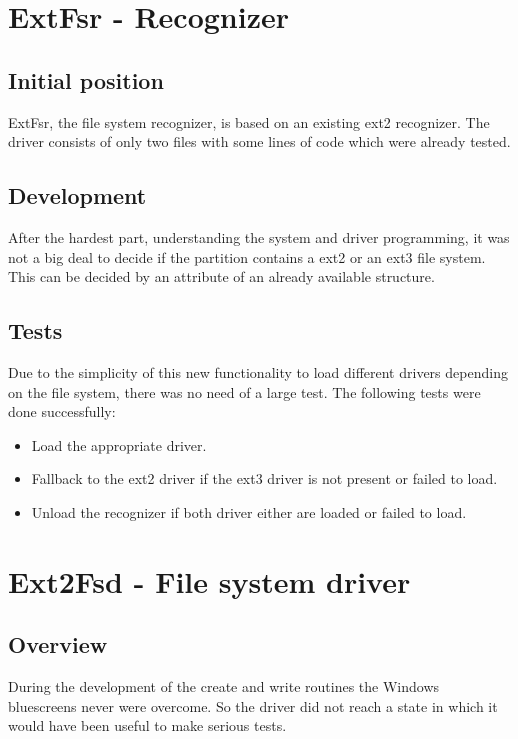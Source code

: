 \chapter{ExtFsr - Recognizer}
\label{cha:extfsrTests}

\section{Initial position}
ExtFsr, the file system recognizer, is based on an existing ext2 recognizer. The driver consists of only two files with some lines of code which were already tested.

\section{Development}
After the hardest part, understanding the system and driver programming, it was not a big deal to decide if the partition contains a ext2 or an ext3 file system. This can be decided by an attribute of an already available structure.

\section{Tests}
Due to the simplicity of this new functionality to load different drivers depending on the file system, there was no need of a large test. The following tests were done successfully:
\begin{itemize}
  \item Load the appropriate driver.
  \item Fallback to the ext2 driver if the ext3 driver is not present or failed to load.
  \item Unload the recognizer if both driver either are loaded or failed to load.
\end{itemize}

\chapter{Ext2Fsd - File system driver}
\label{cha:ext2fsdTests}

\section{Overview}
During the development of the create and write routines the Windows bluescreens never were overcome. So the driver did not reach a state in which it would have been useful to make serious tests.

